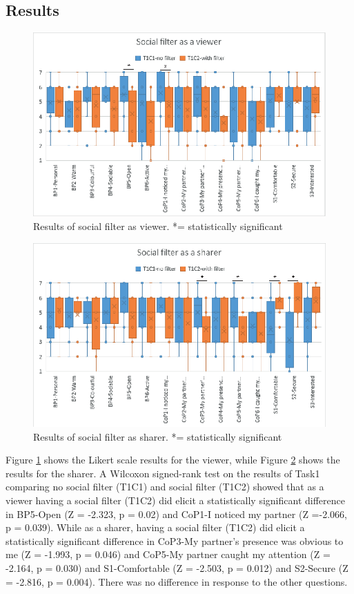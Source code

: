 \subsection{Results}

\begin{figure}
\begin{center}
\includegraphics[width=0.8\linewidth]{images/frontier18/images-03.eps}
\caption{Results of social filter as viewer. *= statistically significant}\label{fig:frontier18:result-filter-viewer}
\end{center}
\end{figure}

\begin{figure}
\begin{center}
\includegraphics[width=0.8\linewidth]{images/frontier18/images-04.eps}
\caption{Results of social filter as sharer. *= statistically significant}\label{fig:frontier18:result-filter-sharer}
\end{center}
\end{figure}

Figure \ref{fig:frontier18:result-filter-viewer} shows the Likert scale results for the viewer, while Figure \ref{fig:frontier18:result-filter-sharer} shows the results for the sharer. A Wilcoxon signed-rank test on the results of Task1 comparing no social filter (T1C1) and social filter (T1C2) showed that as a viewer having a social filter (T1C2) did elicit a statistically significant difference in BP5-Open (Z = -2.323, p = 0.02) and CoP1-I noticed my partner (Z =-2.066, p = 0.039). While as a sharer, having a social filter (T1C2) did elicit a statistically significant difference in CoP3-My partner's presence was obvious to me (Z = -1.993, p = 0.046) and CoP5-My partner caught my attention (Z = -2.164, p = 0.030) and S1-Comfortable (Z = -2.503, p = 0.012) and S2-Secure (Z = -2.816, p = 0.004). There was no difference in response to the other questions.


